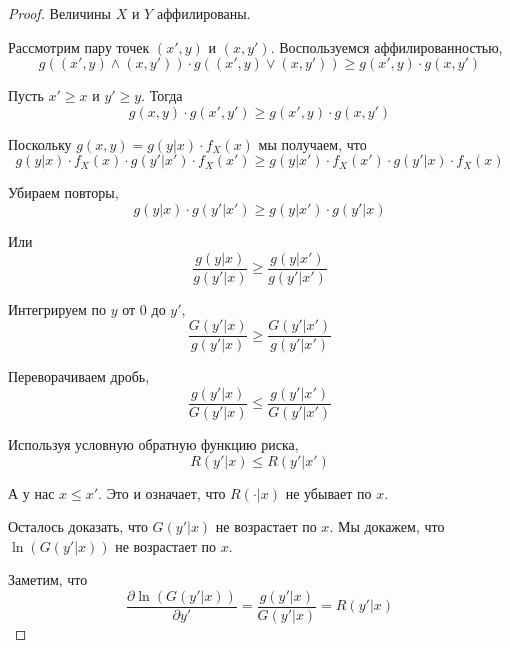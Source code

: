 \begin{proof}
Величины $ X $ и $ Y $ аффилированы.

Рассмотрим пару точек $ (x',y) $ и $ (x,y') $. Воспользуемся аффилированностью,
\begin{equation}
g((x',y)\wedge (x,y'))\cdot g((x',y)\vee (x,y'))\geq g(x',y)\cdot g(x,y')
\end{equation}


Пусть $ x'\geq x $ и $ y'\geq y $. Тогда
\begin{equation}
g(x,y)\cdot g(x',y')\geq g(x',y)\cdot g(x,y')
\end{equation}

Поскольку $ g(x,y)=g(y|x)\cdot f_{X}(x) $ мы получаем, что
\begin{equation}
g(y|x)\cdot f_{X}(x)\cdot g(y'|x')\cdot f_{X}(x')\geq g(y|x')\cdot f_{X}(x')\cdot g(y'|x)\cdot f_{X}(x)
\end{equation}

Убираем повторы,
\begin{equation}
g(y|x)\cdot g(y'|x')\geq g(y|x')\cdot g(y'|x)
\end{equation}

Или
\begin{equation}
\frac{g(y|x)}{g(y'|x)}\geq \frac{g(y|x')}{g(y'|x')}
\end{equation}

Интегрируем по $ y $ от $ 0 $ до $ y' $,
\begin{equation}
\frac{G(y'|x)}{g(y'|x)}\geq \frac{G(y'|x')}{g(y'|x')}
\end{equation}

Переворачиваем дробь,
\begin{equation}
\frac{g(y'|x)}{G(y'|x)}\leq \frac{g(y'|x')}{G(y'|x')}
\end{equation}

Используя условную обратную функцию риска,
\begin{equation}
R(y'|x)\leq R(y'|x')
\end{equation}

А у нас $ x\leq x' $. Это и означает, что $ R(\cdot|x) $ не убывает по $ x $.

Осталось доказать, что $ G(y'|x) $ не возрастает по $ x $. Мы докажем, что $ \ln (G(y'|x)) $ не возрастает по $ x $.

Заметим, что
\begin{equation}
\frac{\partial \ln (G(y'|x))}{\partial y'}=\frac{g(y'|x)}{G(y'|x)}=R(y'|x)
\end{equation}


\end{proof}
